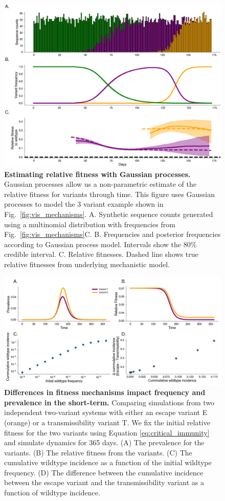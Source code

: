 \documentclass[12pt,oneside,letterpaper]{article}
\begin{document}
\begin{figure}[h]
    \centering
    \includegraphics[width=0.8\linewidth]{./figures/gp_example.png}
    \caption{\textbf{Estimating relative fitness with Gaussian processes.}
    Gaussian processes allow us a non-parametric estimate of the relative fitness for variants through time.
    This figure uses Gaussian processes to model the 3 variant example shown in Fig.~\ref{fig:vis_mechanisms}.
    A. Synthetic sequence counts generated using a multinomial distribution with frequencies from Fig.~\ref{fig:vis_mechanisms}C.
    B. Frequencies and posterior frequencies according to Gaussian process model. Intervals show the 80\% credible interval.
    C. Relative fitnesses. Dashed line shows true relative fitnesses from underlying mechanistic model.
}
    \label{fig:gp_example}
\end{figure}

\begin{figure}[h]
    \centering
    \includegraphics[width=0.8\linewidth]{./figures/short_term_divergence.png}
    \caption{\textbf{Differences in fitness mechanisms impact frequency and prevalence in the short-term.}
    Comparing simulations from two independent two-variant systems with either an escape variant E (orange) or a transmissibility variant T.
    We fix the initial relative fitness for the two variants using Equation \ref{eq:critical_immunity} and simulate dynamics for 365 days.
    (A) The prevalence for the variants.
    (B) The relative fitness from the variants.
    (C) The cumulative wildtype incidence as a function of the initial wildtype frequency.
    (D) The difference between the cumulative incidence between the escape variant and the transmissibility variant as a function of wildtype incidence.
    }%
    \label{fig:short_term_divergence}
\end{figure}
\end{document}
